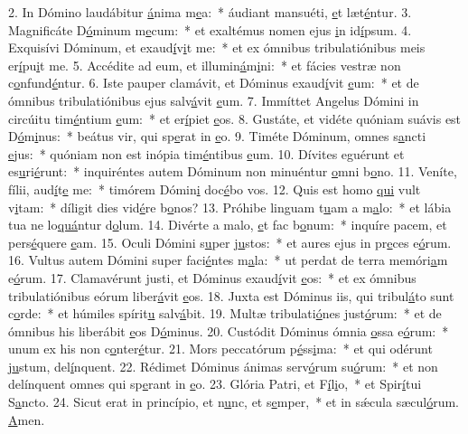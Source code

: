 2. In Dómino laudábitur \uline{á}nima m\uline{e}a:~* áudiant mansuéti, \uline{e}t læt\uline{é}ntur.
3. Magnificáte D\uline{ó}minum m\uline{e}cum:~* et exaltémus nomen ejus \uline{i}n id\uline{í}psum.
4. Exquisívi Dóminum, et exaud\uline{í}v\uline{i}t me:~* et ex ómnibus tribulatiónibus meis er\uline{í}pu\uline{i}t me.
5. Accédite ad eum, et illumin\uline{á}m\uline{i}ni:~* et fácies vestræ non c\uline{o}nfund\uline{é}ntur.
6. Iste pauper clamávit, et Dóminus exaud\uline{í}vit \uline{e}um:~* et de ómnibus tribulatiónibus ejus salv\uline{á}vit \uline{e}um.
7. Immíttet Angelus Dómini in circúitu tim\uline{é}ntium \uline{e}um:~* et er\uline{í}piet \uline{e}os.
8. Gustáte, et vidéte quóniam suávis est D\uline{ó}m\uline{i}nus:~* beátus vir, qui sp\uline{e}rat in \uline{e}o.
9. Timéte Dóminum, omnes s\uline{a}ncti \uline{e}jus:~* quóniam non est inópia tim\uline{é}ntibus \uline{e}um.
10. Dívites eguérunt et es\uline{u}ri\uline{é}runt:~* inquiréntes autem Dóminum non minuéntur \uline{o}mni b\uline{o}no.
11. Veníte, fílii, aud\uline{í}t\uline{e} me:~* timórem Dómin\uline{i} doc\uline{é}bo vos.
12. Quis est homo \uline{qui} vult v\uline{i}tam:~* díligit dies vid\uline{é}re b\uline{o}nos?
13. Próhibe linguam t\uline{u}am a m\uline{a}lo:~* et lábia tua ne lo\uline{quá}ntur d\uline{o}lum.
14. Divérte a malo, \uline{e}t fac b\uline{o}num:~* inquíre pacem, et pers\uline{é}quere \uline{e}am.
15. Oculi Dómini s\uline{u}per j\uline{u}stos:~* et aures ejus in pr\uline{e}ces e\uline{ó}rum.
16. Vultus autem Dómini super faci\uline{é}ntes m\uline{a}la:~* ut perdat de terra memóri\uline{a}m e\uline{ó}rum.
17. Clamavérunt justi, et Dóminus exaud\uline{í}vit \uline{e}os:~* et ex ómnibus tribulatiónibus eórum liber\uline{á}vit \uline{e}os.
18. Juxta est Dóminus iis, qui tribul\uline{á}to sunt c\uline{o}rde:~* et húmiles spírit\uline{u} salv\uline{á}bit.
19. Multæ tribulati\uline{ó}nes just\uline{ó}rum:~* et de ómnibus his liberábit \uline{e}os D\uline{ó}minus.
20. Custódit Dóminus ómnia \uline{o}ssa e\uline{ó}rum:~* unum ex his non c\uline{o}nter\uline{é}tur.
21. Mors peccatórum p\uline{é}ss\uline{i}ma:~* et qui odérunt j\uline{u}stum, del\uline{í}nquent.
22. Rédimet Dóminus ánimas serv\uline{ó}rum su\uline{ó}rum:~* et non delínquent omnes qui sp\uline{e}rant in \uline{e}o.
23. Glória Patri, et F\uline{í}l\uline{i}o,~* et Spir\uline{í}tui S\uline{a}ncto.
24. Sicut erat in princípio, et n\uline{u}nc, et s\uline{e}mper,~* et in sǽcula sæcul\uline{ó}rum. \uline{A}men.
